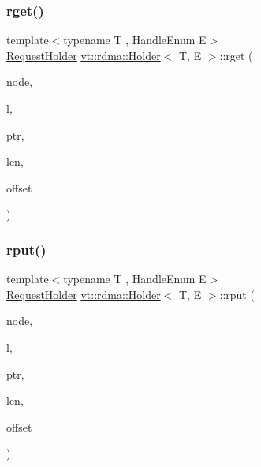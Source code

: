 \subsubsection{\texorpdfstring{rget()}{rget()}}
{\footnotesize\ttfamily template$<$typename T , Handle\+Enum E$>$ \\
\hyperlink{structvt_1_1rdma_1_1_request_holder}{Request\+Holder} \hyperlink{structvt_1_1rdma_1_1_holder}{vt\+::rdma\+::\+Holder}$<$ T, E $>$\+::rget (\begin{DoxyParamCaption}\item[{\hyperlink{namespacevt_a866da9d0efc19c0a1ce79e9e492f47e2}{vt\+::\+Node\+Type}}]{node,  }\item[{\hyperlink{namespacevt_1_1rdma_ac5c20b41a653e520b6305d4d454ecb70}{Lock}}]{l,  }\item[{T $\ast$}]{ptr,  }\item[{std\+::size\+\_\+t}]{len,  }\item[{int}]{offset }\end{DoxyParamCaption})}

\mbox{\label{structvt_1_1rdma_1_1_holder_ae3f9105ec3abe794bd39f24ef55f1c29}} 
\subsubsection{\texorpdfstring{rput()}{rput()}}
{\footnotesize\ttfamily template$<$typename T , Handle\+Enum E$>$ \\
\hyperlink{structvt_1_1rdma_1_1_request_holder}{Request\+Holder} \hyperlink{structvt_1_1rdma_1_1_holder}{vt\+::rdma\+::\+Holder}$<$ T, E $>$\+::rput (\begin{DoxyParamCaption}\item[{\hyperlink{namespacevt_a866da9d0efc19c0a1ce79e9e492f47e2}{vt\+::\+Node\+Type}}]{node,  }\item[{\hyperlink{namespacevt_1_1rdma_ac5c20b41a653e520b6305d4d454ecb70}{Lock}}]{l,  }\item[{T $\ast$}]{ptr,  }\item[{std\+::size\+\_\+t}]{len,  }\item[{int}]{offset }\end{DoxyParamCaption})}

\mbox{\label{structvt_1_1rdma_1_1_holder_ab01f8e7262a04ba7d86501968e2b177d}} 
